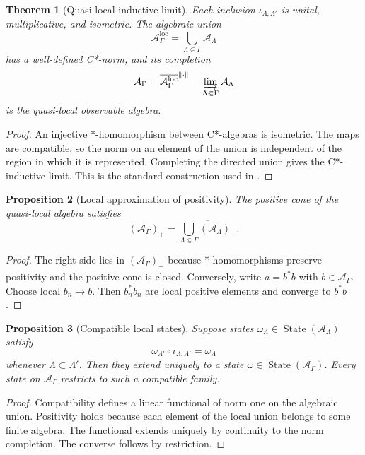 \documentclass[12pt]{article}
\newtheorem{theorem}{Theorem}[section]
\newtheorem{proposition}[theorem]{Proposition}
\theoremstyle{definition}
\theoremstyle{remark}
\newcommand{\A}{\mathcal A}
\newcommand{\State}{\operatorname{State}}
\begin{document}
\begin{theorem}[Quasi-local inductive limit]\label{thm:quasilocal}
Each inclusion $\iota_{\Lambda,\Lambda'}$ is unital, multiplicative, and isometric.  The
algebraic union
\[
\A_{\Gamma}^{\mathrm{loc}}
=
\bigcup_{\Lambda\Subset\Gamma}\A_\Lambda
\]
has a well-defined C*-norm, and its completion
\[
\A_\Gamma
=
\overline{\A_{\Gamma}^{\mathrm{loc}}}^{\|\cdot\|}
=
\varinjlim_{\Lambda\Subset\Gamma}\A_\Lambda
\]
is the quasi-local observable algebra.
\end{theorem}

\begin{proof}
An injective *-homomorphism between C*-algebras is isometric.  The maps are
compatible, so the norm on an element of the union is independent of the region in
which it is represented.  Completing the directed union gives the C*-inductive
limit.  This is the standard construction used in \cite{NSY}.
\end{proof}

\begin{proposition}[Local approximation of positivity]\label{prop:positive-local}
The positive cone of the quasi-local algebra satisfies
\[
(\A_\Gamma)_+
=
\overline{
\bigcup_{\Lambda\Subset\Gamma}(\A_\Lambda)_+
}.
\]
\end{proposition}

\begin{proof}
The right side lies in $(\A_\Gamma)_+$ because *-homomorphisms preserve positivity
and the positive cone is closed.  Conversely, write $a=b^*b$ with
$b\in\A_\Gamma$.  Choose local $b_n\to b$.  Then $b_n^*b_n$ are local positive
elements and converge to $b^*b$.
\end{proof}

\begin{proposition}[Compatible local states]\label{prop:local-states}
Suppose states $\omega_\Lambda\in\State(\A_\Lambda)$ satisfy
\[
\omega_{\Lambda'}\circ\iota_{\Lambda,\Lambda'}=\omega_\Lambda
\]
whenever $\Lambda\subset\Lambda'$.  Then they extend uniquely to a state
$\omega\in\State(\A_\Gamma)$.  Every state on $\A_\Gamma$ restricts to such a
compatible family.
\end{proposition}

\begin{proof}
Compatibility defines a linear functional of norm one on the algebraic union.
Positivity holds because each element of the local union belongs to some finite
algebra.  The functional extends uniquely by continuity to the norm completion.
The converse follows by restriction.
\end{proof}
\end{document}
